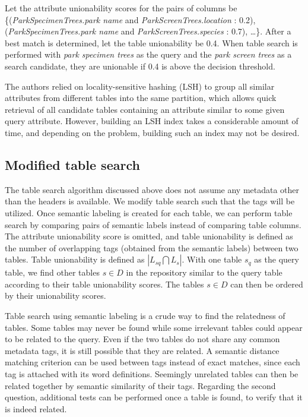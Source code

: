 Let the attribute unionability scores for the pairs of columns be \\ \{(\textit{ParkSpecimenTrees.park name} and \textit{ParkScreenTrees.location} : 0.2), (\textit{ParkSpecimenTrees.park name} and \textit{ParkScreenTrees.species} : 0.7), \dots\}. After a best match is determined, let the table unionability be 0.4. When table search is performed with \textit{park specimen trees} as the query and the \textit{park screen trees} as a search candidate, they are unionable if 0.4 is above the decision threshold.

The authors relied on locality-sensitive hashing (LSH) to group all similar attributes from different tables into the same partition, which allows quick retrieval of all candidate tables containing an attribute similar to some given query attribute. However, building an LSH index takes a considerable amount of time, and depending on the problem, building such an index may not be desired.

\subsection{Modified table search}
\label{ssec:ModifiedTableSearch}

The table search algorithm discussed above does not assume any metadata other than the headers is available. We modify table search such that the tags will be utilized. Once semantic labeling is created for each table, we can perform table search by comparing pairs of semantic labels instead of comparing table columns. The attribute unionability score is omitted, and table unionability is defined as the number of overlapping tags (obtained from the semantic labels) between two tables. Table unionability is defined as $|L_{sq}\bigcap L_{s}|$. With one table $s_{q}$ as the query table, we find other tables $s\in D$ in the repository similar to the query table according to their table unionability scores. The tables $s\in D$ can then be ordered by their unionability scores.

Table search using semantic labeling is a crude way to find the relatedness of tables. Some tables may never be found while some irrelevant tables could appear to be related to the query. Even if the two tables do not share any common metadata tags, it is still possible that they are related. A semantic distance matching criterion can be used between tags instead of exact matches, since each tag is attached with its word definitions. Seemingly unrelated tables can then be related together by semantic similarity of their tags. Regarding the second question, additional tests can be performed once a table is found, to verify that it is indeed related.

